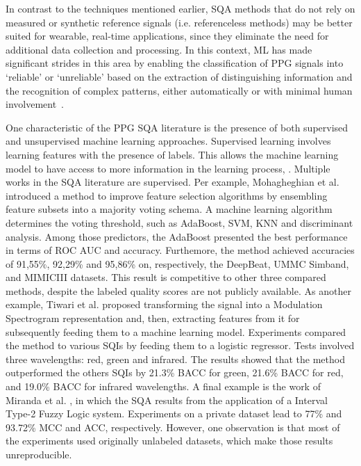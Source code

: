 In contrast to the techniques mentioned earlier, \gls{SQA} methods that do not rely on measured or synthetic reference signals (i.e. referenceless methods) may be better suited for wearable, real-time applications, since they eliminate the need for additional data collection and processing. In this context, \gls{ML} has made significant strides in this area by enabling the classification of \gls{PPG} signals into `reliable' or `unreliable' based on the extraction of distinguishing information and the recognition of complex patterns, either automatically or with minimal human involvement~\cite{janiesch2021machine}. 


		
One characteristic of the \gls{PPG} \gls{SQA} literature is the presence of both supervised and unsupervised machine learning approaches. Supervised learning involves learning features with the presence of labels. This allows the machine learning model to have access to more information in the learning process, . Multiple works in the \gls{SQA} literature are supervised. Per example, Mohagheghian et al. \cite{ppg-sqa-1} introduced a method to improve feature selection algorithms by ensembling feature subsets into a majority voting schema. A machine learning algorithm determines the voting threshold, such as AdaBoost, \gls{SVM}, \gls{KNN} and discriminant analysis. Among those predictors, the AdaBoost presented the best performance in terms of \gls{ROC AUC} and accuracy. Furthemore, the method achieved accuracies of 91,55\%, 92,29\% and 95,86\% on, respectively, the DeepBeat, UMMC Simband, and MIMICIII datasets. This result is competitive to other three compared methods, despite the labeled quality scores are not publicly available. As another example, Tiwari et al. \cite{ppg-sqa-2} proposed transforming the signal into a Modulation Spectrogram representation and, then, extracting features from it for subsequently feeding them to a machine learning model. Experiments compared the method to various \glspl{SQI} by feeding them to a logistic regressor. Tests involved three wavelengths: red, green and infrared. The results showed that the method outperformed the others \glspl{SQI} by 21.3\% \gls{BACC} for green, 21.6\% \gls{BACC} for red, and 19.0\% \gls{BACC} for infrared wavelengths. A final example is the work of Miranda et al. \cite{ppg-sqa-3}, in which the \gls{SQA} results from the application of a Interval Type-2 Fuzzy Logic system. Experiments on a private dataset lead to 77\% and 93.72\% \gls{MCC} and \gls{ACC}, respectively. However, one observation is that most of the experiments used originally unlabeled datasets, which make those results unreproducible. 
	
